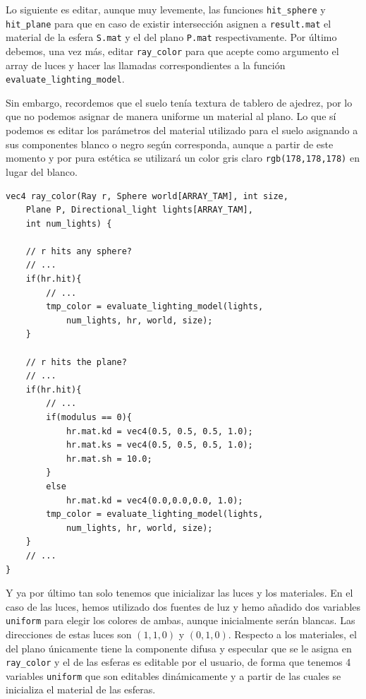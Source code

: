 Lo siguiente es editar, aunque muy levemente, las funciones \verb|hit_sphere| y \verb|hit_plane| para que en caso de existir intersección asignen a \verb|result.mat| el material de la esfera \verb|S.mat| y el del plano \verb|P.mat| respectivamente. Por último debemos, una vez más, editar \verb|ray_color| para que acepte como argumento el array de luces y hacer las llamadas correspondientes a la función \verb|evaluate_lighting_model|.

Sin embargo, recordemos que el suelo tenía textura de tablero de ajedrez, por lo que no podemos asignar de manera uniforme un material al plano. Lo que sí podemos es editar los parámetros del material utilizado para el suelo asignando a sus componentes blanco o negro según corresponda, aunque a partir de este momento y por pura estética se utilizará un color gris claro \verb|rgb(178,178,178)| en lugar del blanco.

\begin{lstlisting}
vec4 ray_color(Ray r, Sphere world[ARRAY_TAM], int size, 
    Plane P, Directional_light lights[ARRAY_TAM], 
    int num_lights) {

    // r hits any sphere?
    // ...
    if(hr.hit){
        // ... 
        tmp_color = evaluate_lighting_model(lights, 
            num_lights, hr, world, size);
    }

    // r hits the plane? 
    // ...
    if(hr.hit){
        // ... 
        if(modulus == 0){
            hr.mat.kd = vec4(0.5, 0.5, 0.5, 1.0);
            hr.mat.ks = vec4(0.5, 0.5, 0.5, 1.0);
            hr.mat.sh = 10.0;
        }
        else
            hr.mat.kd = vec4(0.0,0.0,0.0, 1.0);
        tmp_color = evaluate_lighting_model(lights, 
            num_lights, hr, world, size);
    }
    // ...
}
\end{lstlisting}

Y ya por último tan solo tenemos que inicializar las luces y los materiales. En el caso de las luces, hemos utilizado dos fuentes de luz y hemo añadido dos variables \verb|uniform| para elegir los colores de ambas, aunque inicialmente serán blancas. Las direcciones de estas luces son $(1,1,0)$ y $(0,1,0)$. Respecto a los materiales, el del plano únicamente tiene la componente difusa y especular que se le asigna en \verb|ray_color| y el de las esferas es editable por el usuario, de forma que tenemos 4 variables \verb|uniform| que son editables dinámicamente y a partir de las cuales se inicializa el material de las esferas.

